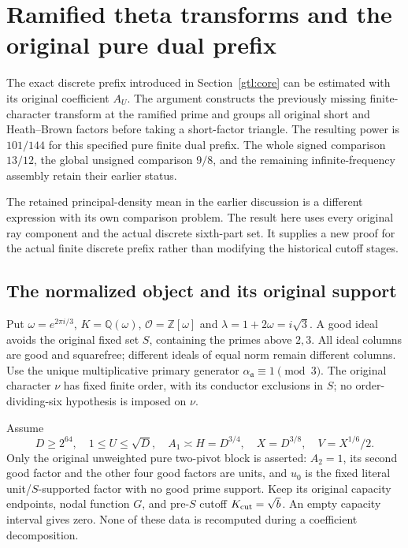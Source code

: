 \section{Ramified theta transforms and the original pure dual prefix}
\label{rg:core}
The exact discrete prefix introduced in Section~\ref{gtl:core}
can be estimated with its original coefficient \(A_U\).
The argument constructs the previously missing finite-character
transform at the ramified prime and groups all original short and
Heath--Brown factors before taking a short-factor triangle.
The resulting power is \(101/144\) for this specified pure finite
dual prefix. The whole signed comparison \(13/12\), the global
unsigned comparison \(9/8\), and the remaining infinite-frequency
assembly retain their earlier status.

The retained principal-density mean in the earlier discussion is a
different expression with its own comparison problem. The result here
uses every original ray component and the actual discrete sixth-part
set. It supplies a new proof for the actual finite discrete prefix rather than modifying
the historical cutoff stages.

\subsection{The normalized object and its original support}
\label{rg:objects}
Put \(\omega=e^{2\pi i/3}\), \(K=\mathbb Q(\omega)\), \(\mathcal O=\mathbb Z[\omega]\) and
\(\lambda=1+2\omega=i\sqrt3\). A good ideal avoids the original fixed
set \(S\), containing the primes above \(2,3\).
All ideal columns are good and squarefree; different ideals of equal
norm remain different columns. Use the unique multiplicative primary
generator \(\alpha_{\mathfrak a}\equiv1\pmod3\).
The original character \(\nu\) has fixed finite order, with its
conductor exclusions in \(S\); no order-dividing-six hypothesis is
imposed on \(\nu\).

Assume
\begin{equation}\label{rg:scales}
 D\ge2^{64},\quad 1\le U\le\sqrt D,\quad
 A_1\asymp H=D^{3/4},\quad X=D^{3/8},\quad
 V=X^{1/6}/2 .
\end{equation}
Only the original unweighted pure two-pivot block is asserted:
\(A_2=1\), its second good factor and the other four good factors are
units, and \(u_0\) is the fixed literal unit/\(S\)-supported factor with
no good prime support. Keep its original capacity endpoints, nodal
function \(G\), and pre-\(S\) cutoff \(K_{\rm cut}=\sqrt b\).
An empty capacity interval gives zero. None of these data is
recomputed during a coefficient decomposition.

